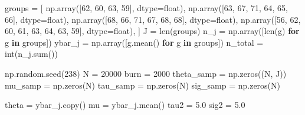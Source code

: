\documentclass[
  letterpaper,
  DIV=11,
  numbers=noendperiod]{scrartcl}
\newenvironment{Shaded}{\begin{snugshade}}{\end{snugshade}}
\newcommand{\BuiltInTok}[1]{\textcolor[rgb]{0.00,0.23,0.31}{#1}}
\newcommand{\ControlFlowTok}[1]{\textcolor[rgb]{0.00,0.23,0.31}{\textbf{#1}}}
\newcommand{\DecValTok}[1]{\textcolor[rgb]{0.68,0.00,0.00}{#1}}
\newcommand{\FloatTok}[1]{\textcolor[rgb]{0.68,0.00,0.00}{#1}}
\newcommand{\KeywordTok}[1]{\textcolor[rgb]{0.00,0.23,0.31}{\textbf{#1}}}
\newcommand{\NormalTok}[1]{\textcolor[rgb]{0.00,0.23,0.31}{#1}}
\newcommand{\OperatorTok}[1]{\textcolor[rgb]{0.37,0.37,0.37}{#1}}
\begin{document}
\begin{Shaded}
\begin{Highlighting}[]
\NormalTok{groups }\OperatorTok{=}\NormalTok{ [}
\NormalTok{    np.array([}\DecValTok{62}\NormalTok{, }\DecValTok{60}\NormalTok{, }\DecValTok{63}\NormalTok{, }\DecValTok{59}\NormalTok{], dtype}\OperatorTok{=}\BuiltInTok{float}\NormalTok{),}
\NormalTok{    np.array([}\DecValTok{63}\NormalTok{, }\DecValTok{67}\NormalTok{, }\DecValTok{71}\NormalTok{, }\DecValTok{64}\NormalTok{, }\DecValTok{65}\NormalTok{, }\DecValTok{66}\NormalTok{], dtype}\OperatorTok{=}\BuiltInTok{float}\NormalTok{),}
\NormalTok{    np.array([}\DecValTok{68}\NormalTok{, }\DecValTok{66}\NormalTok{, }\DecValTok{71}\NormalTok{, }\DecValTok{67}\NormalTok{, }\DecValTok{68}\NormalTok{, }\DecValTok{68}\NormalTok{], dtype}\OperatorTok{=}\BuiltInTok{float}\NormalTok{),}
\NormalTok{    np.array([}\DecValTok{56}\NormalTok{, }\DecValTok{62}\NormalTok{, }\DecValTok{60}\NormalTok{, }\DecValTok{61}\NormalTok{, }\DecValTok{63}\NormalTok{, }\DecValTok{64}\NormalTok{, }\DecValTok{63}\NormalTok{, }\DecValTok{59}\NormalTok{], dtype}\OperatorTok{=}\BuiltInTok{float}\NormalTok{),}
\NormalTok{]}
\NormalTok{J }\OperatorTok{=} \BuiltInTok{len}\NormalTok{(groups)}
\NormalTok{n\_j }\OperatorTok{=}\NormalTok{ np.array([}\BuiltInTok{len}\NormalTok{(g) }\ControlFlowTok{for}\NormalTok{ g }\KeywordTok{in}\NormalTok{ groups])}
\NormalTok{ybar\_j }\OperatorTok{=}\NormalTok{ np.array([g.mean() }\ControlFlowTok{for}\NormalTok{ g }\KeywordTok{in}\NormalTok{ groups])}
\NormalTok{n\_total }\OperatorTok{=} \BuiltInTok{int}\NormalTok{(n\_j.}\BuiltInTok{sum}\NormalTok{())}

\NormalTok{np.random.seed(}\DecValTok{238}\NormalTok{)}
\NormalTok{N }\OperatorTok{=} \DecValTok{20000}
\NormalTok{burn }\OperatorTok{=} \DecValTok{2000}
\NormalTok{theta\_samp }\OperatorTok{=}\NormalTok{ np.zeros((N, J))}
\NormalTok{mu\_samp    }\OperatorTok{=}\NormalTok{ np.zeros(N)}
\NormalTok{tau\_samp   }\OperatorTok{=}\NormalTok{ np.zeros(N)}
\NormalTok{sig\_samp   }\OperatorTok{=}\NormalTok{ np.zeros(N)}

\NormalTok{theta }\OperatorTok{=}\NormalTok{ ybar\_j.copy()}
\NormalTok{mu    }\OperatorTok{=}\NormalTok{ ybar\_j.mean()}
\NormalTok{tau2  }\OperatorTok{=} \FloatTok{5.0}
\NormalTok{sig2  }\OperatorTok{=} \FloatTok{5.0}


\end{Highlighting}
\end{Shaded}
\end{document}
